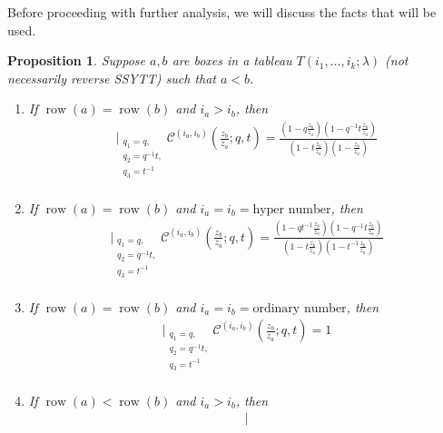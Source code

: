 \documentclass[12pt,reqno,a4paper]{amsart}
\newcommand{\cals}[1]{\mathcal{#1}}
\numberwithin{equation}{section}
\newtheorem{prop}[thm]{Proposition}
\theoremstyle{definition}
\begin{document}
Before proceeding with further analysis, we will discuss the facts that will be used. 

\begin{prop}
\label{prpa15-1033-1aug}
Suppose $a,b$ are boxes in a tableau $T(i_1,\dots,i_k;\lambda)$ (not necessarily reverse SSYTT) such that $a < b$. 
\begin{enumerate}[(1)]
	\item If $\operatorname{row}(a) = \operatorname{row}(b)$ and $i_a > i_b$, then 
	\footnotesize
	\begin{align}
		\bigg|_{
			\substack{
				q_1 = q, \\
				q_2 = q^{-1}t,\\
				q_3 = t^{-1} \\
			}
		}
		\cals{C}^{(i_a,i_b)}\left(
		\frac{z_b}{z_a}
		; q, t
		\right)
		= 
		\frac{
			\left(1 - q\frac{z_b}{z_a}\right)
			\left(1 - q^{-1}t\frac{z_b}{z_a}\right)
		}{
			\left(1 - t\frac{z_b}{z_a}\right)
			\left(1 - \frac{z_b}{z_a}\right)
		}
	\end{align}
	\normalsize
	\item If $\operatorname{row}(a) = \operatorname{row}(b)$ and $i_a = i_b = \text{hyper number}$, then 
	\footnotesize
	\begin{align}
		\bigg|_{
			\substack{
				q_1 = q, \\
				q_2 = q^{-1}t,\\
				q_3 = t^{-1} \\
			}
		}
		\cals{C}^{(i_a,i_b)}\left(
		\frac{z_b}{z_a}
		; q, t
		\right)
		= 
		\frac{
			\left(1 - qt^{-1}\frac{z_b}{z_a}\right)
			\left(1 - q^{-1}t\frac{z_b}{z_a}\right)
		}{
			\left(1 - t\frac{z_b}{z_a}\right)
			\left(1 - t^{-1}\frac{z_b}{z_a}\right)
		}
	\end{align}
	\normalsize
	\item If $\operatorname{row}(a) = \operatorname{row}(b)$ and $i_a = i_b = \text{ordinary number}$, then 
	\footnotesize
	\begin{align}
		\bigg|_{
			\substack{
				q_1 = q, \\
				q_2 = q^{-1}t,\\
				q_3 = t^{-1} \\
			}
		}
		\cals{C}^{(i_a,i_b)}\left(
		\frac{z_b}{z_a}
		; q, t
		\right)
		= 1 
	\end{align}
	\normalsize
	\item If $\operatorname{row}(a) < \operatorname{row}(b)$ and $i_a > i_b$, then 
	\footnotesize
	\begin{align}
		\bigg|_{
}
\end{align}
\end{enumerate}
\end{prop}
\end{document}
